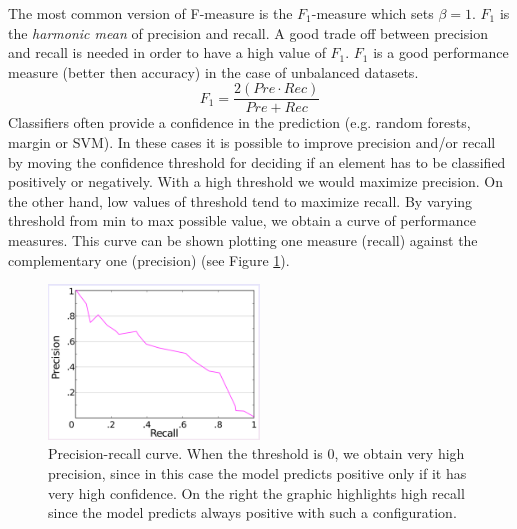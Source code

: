 
The most common version of F-measure is the $F_1$-measure which sets $\beta=1$. $F_1$ is the \textit{harmonic mean} of precision and recall. A good trade off between precision and recall is needed in order to have a high value of $F_1$. $F_1$ is a good performance measure (better then accuracy) in the case of unbalanced datasets.
\begin{equation}
    F_1 = \frac{2(\mathit{Pre} \cdot \mathit{Rec})}{\mathit{Pre} + \mathit{Rec}}
\end{equation}
Classifiers often provide a confidence in the prediction (e.g. random forests, margin or SVM). In these cases it is possible to improve precision and/or recall by moving the confidence threshold for deciding if an element has to be classified positively or negatively. With a high threshold we would maximize precision. On the other hand, low values of threshold tend to maximize recall. By varying threshold from min to max possible value, we obtain a curve of performance measures. This curve can be shown plotting one measure (recall) against the complementary one (precision) (see Figure \ref{fig:precisionRecallCurve}).

\begin{figure}
    \centering
    \includegraphics[width=0.5\textwidth]{images/precisionReacall_curve.png}
    \caption{Precision-recall curve. When the threshold is 0, we obtain very high precision, since in this case the model predicts positive only if it has very high confidence. On the right the graphic highlights high recall since the model predicts always positive with such a configuration.}
    \label{fig:precisionRecallCurve}
\end{figure}

